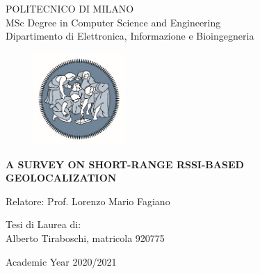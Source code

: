 \documentclass[12pt]{report}
\begin{document}

\thispagestyle{empty}
\vspace*{-1.5cm} \bfseries{
\begin{center}
  \large
  POLITECNICO DI MILANO\\
  \normalsize
  MSc Degree in Computer Science and Engineering\\
  Dipartimento di Elettronica, Informazione e Bioingegneria\\
  \begin{figure}[htbp]
    \begin{center}
      \includegraphics[width=3.5cm]{./pictures/logopm.jpg}
    \end{center}
  \end{figure}
  \vspace*{0.3cm} \LARGE



  \textbf{A SURVEY ON SHORT-RANGE RSSI-BASED GEOLOCALIZATION}\\



\end{center}
\vspace*{3.0cm} \large
\begin{flushleft}


  Relatore: Prof. Lorenzo Mario Fagiano \\

\end{flushleft}
\vspace*{1.0cm}
\begin{flushright}


  Tesi di Laurea di:\\ Alberto Tiraboschi, matricola 920775 \\


\end{flushright}
\vspace*{1cm}
\begin{center}



  Academic Year 2020/2021
\end{center} \clearpage
}
\thispagestyle{empty}  \normalfont \cleardoublepage
\newpage
\end{document}
